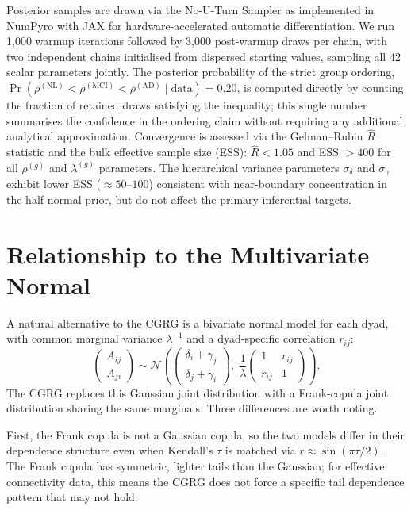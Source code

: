\documentclass[12pt]{article}
\begin{document}
Posterior samples are drawn via the No-U-Turn Sampler
\citep[NUTS;][]{hoffman2014} as implemented in NumPyro \citep{phan2019} with
JAX \citep{jax2018} for hardware-accelerated automatic differentiation.
We run 1,000 warmup iterations followed by 3,000 post-warmup draws per chain,
with two independent chains initialised from dispersed starting values,
sampling all 42 scalar parameters jointly.  The posterior probability of the
strict group ordering,
$\Pr(\rho^{(\mathrm{NL})} < \rho^{(\mathrm{MCI})} < \rho^{(\mathrm{AD})}
\mid \mathrm{data}) = 0.20$, is computed directly by counting the fraction of
retained draws satisfying the inequality; this single number summarises
the confidence in the ordering claim without requiring any additional
analytical approximation.  Convergence is assessed via the Gelman--Rubin
$\hat{R}$ statistic and the bulk effective sample size (ESS): $\hat{R} < 1.05$
and ESS $> 400$ for all $\rho^{(g)}$ and $\lambda^{(g)}$ parameters.
The hierarchical variance parameters $\sigma_\delta$ and $\sigma_\gamma$
exhibit lower ESS ($\approx 50$--$100$) consistent with near-boundary
concentration in the half-normal prior, but do not affect the primary
inferential targets.

\section{Relationship to the Multivariate Normal}
\label{sec:compare}

A natural alternative to the CGRG is a bivariate normal model for each dyad,
with common marginal variance $\lambda^{-1}$ and a dyad-specific correlation
$r_{ij}$:
\[
\begin{pmatrix} A_{ij} \\ A_{ji} \end{pmatrix}
\sim \mathcal{N}\!\left(
  \begin{pmatrix} \delta_i + \gamma_j \\ \delta_j + \gamma_i \end{pmatrix},\;
  \frac{1}{\lambda}\begin{pmatrix} 1 & r_{ij} \\ r_{ij} & 1 \end{pmatrix}
\right).
\]
The CGRG replaces this Gaussian joint distribution with a Frank-copula joint
distribution sharing the same marginals.  Three differences are worth noting.

First, the Frank copula is not a Gaussian copula, so the two models differ in
their dependence structure even when Kendall's $\tau$ is matched via
$r \approx \sin(\pi\tau/2)$.  The Frank copula has symmetric, lighter tails
than the Gaussian; for effective connectivity data, this means the CGRG does
not force a specific tail dependence pattern that may not hold.
\end{document}
